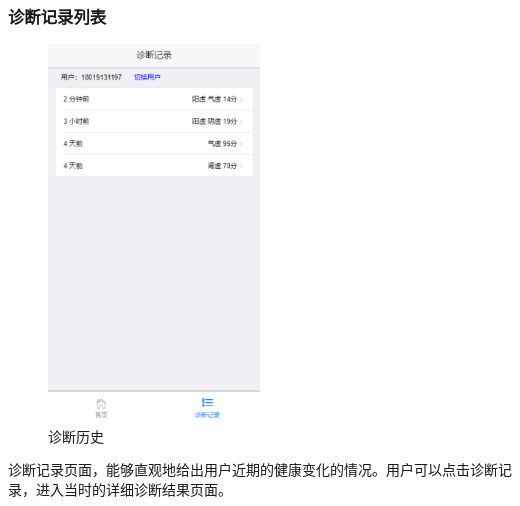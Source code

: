 \subsubsection{诊断记录列表}
\begin{figure}[ht]
    \centering
    \includegraphics[height=10cm]{images/history.png}
    \caption{诊断历史}
    \label{fig:history}
\end{figure}
诊断记录页面，能够直观地给出用户近期的健康变化的情况。用户可以点击诊断记录，进入当时的详细诊断结果页面。

